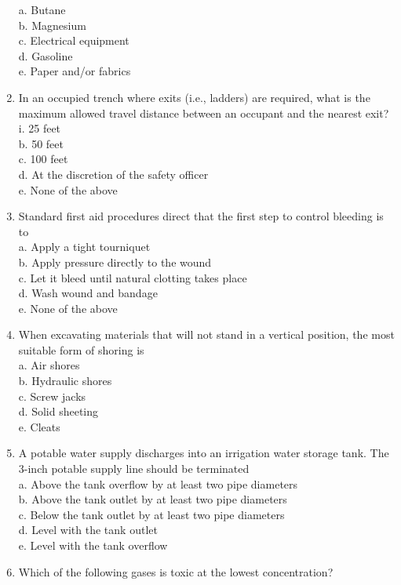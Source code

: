 \begin{enumerate}[1.]
a. Butane\\
b. Magnesium\\
c. Electrical equipment\\
d. Gasoline\\
e. Paper and/or fabrics\\
  \item In an occupied trench where exits (i.e., ladders) are required, what is the maximum allowed travel distance between an occupant and the nearest exit?\\
i. 25 feet\\
b. 50 feet\\
c. 100 feet\\
d. At the discretion of the safety officer\\
e. None of the above\\
  \item Standard first aid procedures direct that the first step to control bleeding is to\\
a. Apply a tight tourniquet\\
b. Apply pressure directly to the wound\\
c. Let it bleed until natural clotting takes place\\
d. Wash wound and bandage\\
e. None of the above\\
  \item When excavating materials that will not stand in a vertical position, the most suitable form of shoring is\\
a. Air shores\\
b. Hydraulic shores\\
c. Screw jacks\\
d. Solid sheeting\\
e. Cleats\\
  \item A potable water supply discharges into an irrigation water storage tank. The 3-inch potable supply line should be terminated\\
a. Above the tank overflow by at least two pipe diameters\\
b. Above the tank outlet by at least two pipe diameters\\
c. Below the tank outlet by at least two pipe diameters\\
d. Level with the tank outlet\\
e. Level with the tank overflow\\
  \item Which of the following gases is toxic at the lowest concentration?\\

\end{enumerate}

